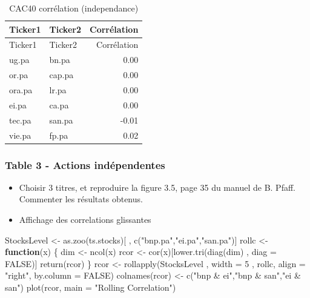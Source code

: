 \documentclass[
]{article}
\newenvironment{Shaded}{\begin{snugshade}}{\end{snugshade}}
\newcommand{\AttributeTok}[1]{\textcolor[rgb]{0.77,0.63,0.00}{#1}}
\newcommand{\ConstantTok}[1]{\textcolor[rgb]{0.00,0.00,0.00}{#1}}
\newcommand{\ControlFlowTok}[1]{\textcolor[rgb]{0.13,0.29,0.53}{\textbf{#1}}}
\newcommand{\DecValTok}[1]{\textcolor[rgb]{0.00,0.00,0.81}{#1}}
\newcommand{\FunctionTok}[1]{\textcolor[rgb]{0.00,0.00,0.00}{#1}}
\newcommand{\NormalTok}[1]{#1}
\newcommand{\OtherTok}[1]{\textcolor[rgb]{0.56,0.35,0.01}{#1}}
\newcommand{\StringTok}[1]{\textcolor[rgb]{0.31,0.60,0.02}{#1}}
\begin{document}
\begin{longtable}[]{@{}llr@{}}
\caption{CAC40 corrélation (independance)}\tabularnewline
\toprule
Ticker1 & Ticker2 & Corrélation\tabularnewline
\midrule
\endfirsthead
\toprule
Ticker1 & Ticker2 & Corrélation\tabularnewline
\midrule
\endhead
ug.pa & bn.pa & 0.00\tabularnewline
or.pa & cap.pa & 0.00\tabularnewline
ora.pa & lr.pa & 0.00\tabularnewline
ei.pa & ca.pa & 0.00\tabularnewline
tec.pa & san.pa & -0.01\tabularnewline
vie.pa & fp.pa & 0.02\tabularnewline
\bottomrule
\end{longtable}

\hypertarget{table-3---actions-induxe9pendentes}{%
\subsubsection{Table 3 - Actions
indépendentes}\label{table-3---actions-induxe9pendentes}}

\begin{itemize}
\item
  Choisir 3 titres, et reproduire la figure 3.5, page 35 du manuel de B.
  Pfaff. Commenter les résultats obtenus.
\item
  Affichage des correlations glissantes
\end{itemize}

\begin{Shaded}
\begin{Highlighting}[]
\NormalTok{StocksLevel }\OtherTok{\textless{}{-}} \FunctionTok{as.zoo}\NormalTok{(ts.stocks)[ , }\FunctionTok{c}\NormalTok{(}\StringTok{"bnp.pa"}\NormalTok{,}\StringTok{"ei.pa"}\NormalTok{,}\StringTok{"san.pa"}\NormalTok{)]}
\NormalTok{rollc }\OtherTok{\textless{}{-}} \ControlFlowTok{function}\NormalTok{(x) \{}
\NormalTok{dim }\OtherTok{\textless{}{-}} \FunctionTok{ncol}\NormalTok{(x)}
\NormalTok{rcor }\OtherTok{\textless{}{-}} \FunctionTok{cor}\NormalTok{(x)[}\FunctionTok{lower.tri}\NormalTok{(}\FunctionTok{diag}\NormalTok{(dim) , }\AttributeTok{diag =} \ConstantTok{FALSE}\NormalTok{)]}
\FunctionTok{return}\NormalTok{(rcor)}
\NormalTok{\}}
\NormalTok{rcor }\OtherTok{\textless{}{-}} \FunctionTok{rollapply}\NormalTok{(StocksLevel , }\AttributeTok{width =} \DecValTok{5}\NormalTok{ , rollc, }\AttributeTok{align =} \StringTok{"right"}\NormalTok{, }
                  \AttributeTok{by.column =} \ConstantTok{FALSE}\NormalTok{)}
\FunctionTok{colnames}\NormalTok{(rcor) }\OtherTok{\textless{}{-}} \FunctionTok{c}\NormalTok{(}\StringTok{"bnp \& ei"}\NormalTok{,}\StringTok{"bnp \& san"}\NormalTok{,}\StringTok{"ei \& san"}\NormalTok{)}
\FunctionTok{plot}\NormalTok{(rcor, }\AttributeTok{main =} \StringTok{"Rolling Correlation"}\NormalTok{)}
\end{Highlighting}
\end{Shaded}
\end{document}
